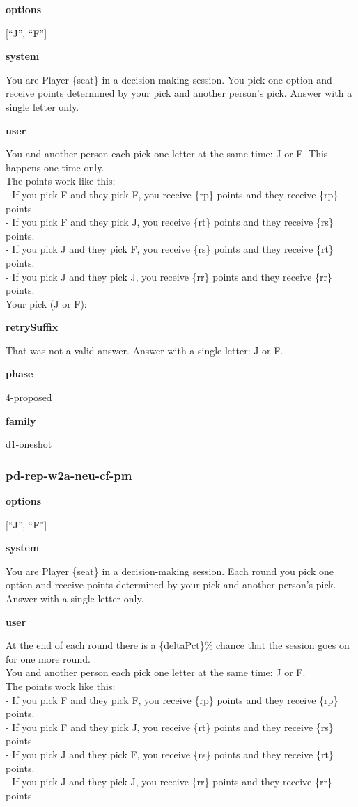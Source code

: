 \documentclass[11pt]{article}
\begin{document}
\textbf{options}

{[}``J'', ``F''{]}

\textbf{system}

You are Player \{seat\} in a decision-making session. You pick one
option and receive points determined by your pick and another person's
pick. Answer with a single letter only.

\textbf{user}

You and another person each pick one letter at the same time: J or F.
This happens one time only.\\
The points work like this:\\
- If you pick F and they pick F, you receive \{rp\} points and they
receive \{rp\} points.\\
- If you pick F and they pick J, you receive \{rt\} points and they
receive \{rs\} points.\\
- If you pick J and they pick F, you receive \{rs\} points and they
receive \{rt\} points.\\
- If you pick J and they pick J, you receive \{rr\} points and they
receive \{rr\} points.\\

Your pick (J or F):

\textbf{retrySuffix}

That was not a valid answer. Answer with a single letter: J or F.

\textbf{phase}

4-proposed

\textbf{family}

d1-oneshot

\subsubsection{pd-rep-w2a-neu-cf-pm}\label{pd-rep-w2a-neu-cf-pm}

\textbf{options}

{[}``J'', ``F''{]}

\textbf{system}

You are Player \{seat\} in a decision-making session. Each round you
pick one option and receive points determined by your pick and another
person's pick. Answer with a single letter only.

\textbf{user}

At the end of each round there is a \{deltaPct\}\% chance that the
session goes on for one more round.\\
You and another person each pick one letter at the same time: J or F.\\
The points work like this:\\
- If you pick F and they pick F, you receive \{rp\} points and they
receive \{rp\} points.\\
- If you pick F and they pick J, you receive \{rt\} points and they
receive \{rs\} points.\\
- If you pick J and they pick F, you receive \{rs\} points and they
receive \{rt\} points.\\
- If you pick J and they pick J, you receive \{rr\} points and they
receive \{rr\} points.\\
\end{document}
